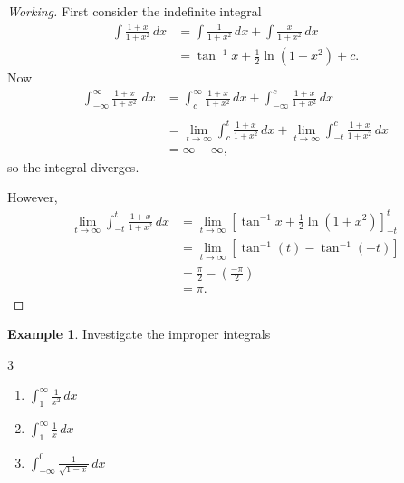 \documentclass[12pt,a4paper]{report}
\theoremstyle{definition}
\newtheorem{exa}[thm]{Example}
\theoremstyle{plain}
\begin{document}
\begin{proof}[Working]
First consider the indefinite integral 
\begin{align*}
\int \frac{1 + x}{1 + x^2}\, dx & = \int \frac{1}{1 + x^2}\, dx + \int\frac{x}{1 + x^2}\, dx\\  
& = \tan^{-1}x + \frac{1}{2}\ln (1 + x^2) + c.
\end{align*}
Now
\begin{align*}
\int^{\infty}_{-\infty} \frac{1 + x}{1 + x^2}\,\, dx & = \int^{\infty}_{c} \frac{1 + x}{1 + x^2}\, dx + \int^{c}_{-\infty} \frac{1 + x}{1 + x^2}\, dx\\\\
& = \lim_{t\rightarrow \infty}\int^{t}_{c} \frac{1 + x}{1 + x^2}\, dx + \lim_{t\rightarrow \infty}\int^{c}_{-t} \frac{1 + x}{1 + x^2}\, dx\\
& = \infty - \infty, 
\end{align*}
so the integral diverges.

However, 
\begin{align*}
\lim_{t\rightarrow \infty} \int_{-t}^t \frac{1 + x}{1 + x^2}\, dx & = \lim_{t\rightarrow \infty}\left[\tan^{-1}x + \frac{1}{2} \ln (1 + x^2) \right]_{-t}^t\\
& = \lim_{t\rightarrow \infty}\left[\tan^{-1}(t) - \tan^{-1}(-t)\right]\\
& = \frac{\pi}{2} - \left(\frac{-\pi}{2}\right)\\
& = \pi.
\end{align*}
\end{proof}





\begin{exa}
Investigate the improper integrals
\begin{multicols}{3}
\begin{enumerate}
\item[(a).] $\displaystyle{\int_1^{\infty} \frac{1}{x^2}\, dx}$
\item[(b).] $\displaystyle{\int_1^{\infty}\frac{1}{x}\, dx}$
\item[(c).] $\displaystyle{\int_{-\infty}^0\frac{1}{\sqrt{1 - x}}\, dx}$
\end{enumerate}
\end{multicols}
\end{exa}
\end{document}
